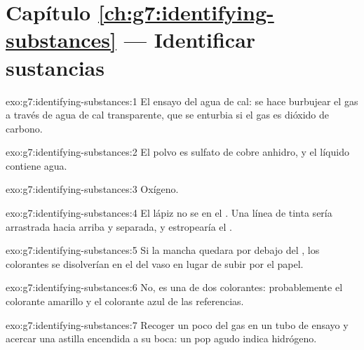 \section*{Capítulo \ref{ch:g7:identifying-substances} --- Identificar sustancias}

\begin{solution}{exo:g7:identifying-substances:1}
El ensayo del agua de cal: se hace burbujear el gas a través de agua de
cal transparente, que se enturbia si el gas es dióxido de carbono.
\end{solution}

\begin{solution}{exo:g7:identifying-substances:2}
El polvo es sulfato de cobre anhidro, y el líquido contiene agua.
\end{solution}

\begin{solution}{exo:g7:identifying-substances:3}
Oxígeno.
\end{solution}

\begin{solution}{exo:g7:identifying-substances:4}
El lápiz no se  en el . Una línea de tinta sería
arrastrada hacia arriba y separada, y estropearía el .
\end{solution}

\begin{solution}{exo:g7:identifying-substances:5}
Si la mancha quedara por debajo del , los colorantes se
disolverían en el  del vaso en lugar de subir por el papel.
\end{solution}

\begin{solution}{exo:g7:identifying-substances:6}
No, es una  de dos colorantes: probablemente el colorante
amarillo y el colorante azul de las referencias.
\end{solution}

\begin{solution}{exo:g7:identifying-substances:7}
Recoger un poco del gas en un tubo de ensayo y acercar una astilla
encendida a su boca: un pop agudo indica hidrógeno.
\end{solution}


